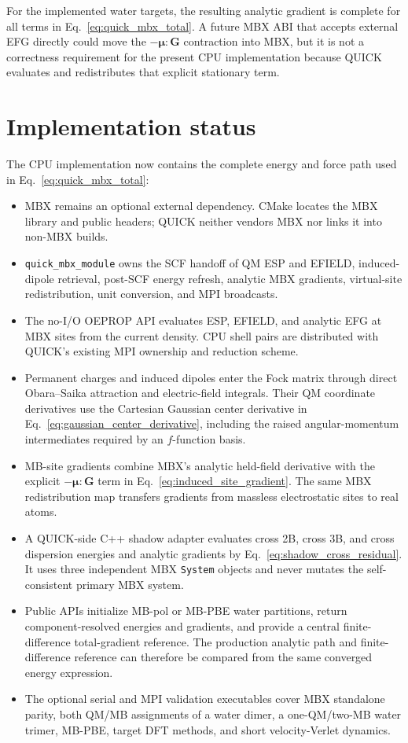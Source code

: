 \documentclass[11pt]{article}
\begin{document}
For the implemented water targets, the resulting analytic gradient is
complete for all terms in Eq.~\ref{eq:quick_mbx_total}. A future MBX ABI
that accepts external EFG directly could move the
$-\boldsymbol\mu\!:\!\mathbf G$ contraction into MBX, but it is not a
correctness requirement for the present CPU implementation because QUICK
evaluates and redistributes that explicit stationary term.

\section{Implementation status}

The CPU implementation now contains the complete energy and force path
used in Eq.~\ref{eq:quick_mbx_total}:
\begin{itemize}
  \item MBX remains an optional external dependency. CMake locates the MBX
    library and public headers; QUICK neither vendors MBX nor links it into
    non-MBX builds.
  \item \texttt{quick\_mbx\_module} owns the SCF handoff of QM ESP and
    EFIELD, induced-dipole retrieval, post-SCF energy refresh, analytic
    MBX gradients, virtual-site redistribution, unit conversion, and MPI
    broadcasts.
  \item The no-I/O OEPROP API evaluates ESP, EFIELD, and analytic EFG at
    MBX sites from the current density. CPU shell pairs are distributed
    with QUICK's existing MPI ownership and reduction scheme.
  \item Permanent charges and induced dipoles enter the Fock matrix through
    direct Obara--Saika attraction and electric-field integrals. Their QM
    coordinate derivatives use the Cartesian Gaussian center derivative in
    Eq.~\ref{eq:gaussian_center_derivative}, including the raised
    angular-momentum intermediates required by an $f$-function basis.
  \item MB-site gradients combine MBX's analytic held-field derivative with
    the explicit $-\boldsymbol{\mu}:\mathbf G$ term in
    Eq.~\ref{eq:induced_site_gradient}. The same MBX redistribution map
    transfers gradients from massless electrostatic sites to real atoms.
  \item A QUICK-side C++ shadow adapter evaluates cross 2B, cross 3B, and
    cross dispersion energies and analytic gradients by
    Eq.~\ref{eq:shadow_cross_residual}. It uses three independent MBX
    \texttt{System} objects and never mutates the self-consistent primary
    MBX system.
  \item Public APIs initialize MB-pol or MB-PBE water partitions, return
    component-resolved energies and gradients, and provide a central
    finite-difference total-gradient reference. The production analytic
    path and finite-difference reference can therefore be compared from the
    same converged energy expression.
  \item The optional serial and MPI validation executables cover MBX
    standalone parity, both QM/MB assignments of a water dimer, a
    one-QM/two-MB water trimer, MB-PBE, target DFT methods, and short
    velocity-Verlet dynamics.
\end{itemize}
\end{document}
